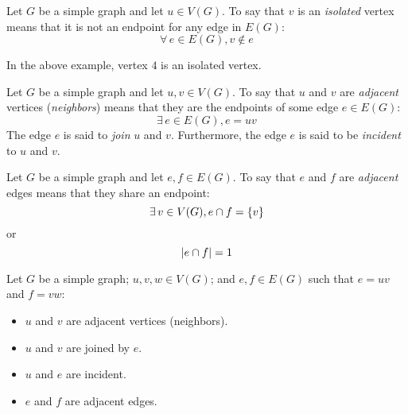 \documentclass[letterpaper,12pt,fleqn]{article}
\begin{document}
\begin{definition}
  Let \(G\) be a simple graph and let \(u\in V(G)\).  To say that \(v\) is an \emph{isolated} vertex means that
  it is not an endpoint for any edge in \(E(G)\):
  \[\forall\,e\in E(G),v\notin e\]
\end{definition}

In the above example, vertex \(4\) is an isolated vertex.

\begin{definition}
  Let \(G\) be a simple graph and let \(u,v\in V(G)\).  To say that \(u\) and \(v\) are \emph{adjacent} vertices
  (\emph{neighbors}) means that they are the endpoints of some edge \(e\in E(G)\):
  \[\exists\,e\in E(G),e=uv\]
  The edge \(e\) is said to \emph{join} \(u\) and \(v\).  Furthermore, the edge \(e\) is said to be \emph{incident}
  to \(u\) and \(v\).
\end{definition}

\begin{definition}
  Let \(G\) be a simple graph and let \(e,f\in E(G)\).  To say that \(e\) and \(f\) are \emph{adjacent} edges means
  that they share an endpoint:
  \[\exists\,v\in V(G),e\cap f=\{v\}\]
  or
  \[\lvert e\cap f\rvert=1\]
\end{definition}

\begin{example}
  Let \(G\) be a simple graph; \(u,v,w\in V(G)\); and \(e,f\in E(G)\) such that \(e=uv\) and \(f=vw\):

  \begin{minipage}{2.5in}
    \vspace{0in}
  \end{minipage}
  \begin{minipage}{3.5in}
    \begin{itemize}
    \item \(u\) and \(v\) are adjacent vertices (neighbors).
    \item \(u\) and \(v\) are joined by \(e\).
    \item \(u\) and \(e\) are incident.
    \item \(e\) and \(f\) are adjacent edges.
    \end{itemize}
  \end{minipage}
\end{example}
\end{document}
